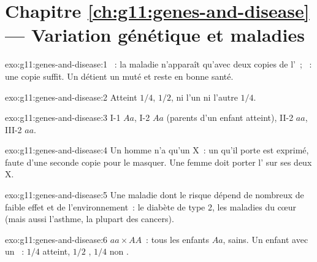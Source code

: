 \section*{Chapitre \ref{ch:g11:genes-and-disease} --- Variation génétique et maladies}

\begin{solution}{exo:g11:genes-and-disease:1}
~: la maladie n'apparaît qu'avec deux copies de l'~;
~: une copie suffit. Un  détient un  muté 
et reste en bonne santé.
\end{solution}

\begin{solution}{exo:g11:genes-and-disease:2}
Atteint $1/4$,  $1/2$, ni l'un ni l'autre $1/4$.
\end{solution}

\begin{solution}{exo:g11:genes-and-disease:3}
I-1 $Aa$, I-2 $Aa$ (parents d'un enfant atteint), II-2 $aa$, III-2
$aa$.
\end{solution}

\begin{solution}{exo:g11:genes-and-disease:4}
Un homme n'a qu'un  X~: un   qu'il porte est
exprimé, faute d'une seconde copie pour le masquer. Une femme doit
porter l' sur ses deux  X.
\end{solution}

\begin{solution}{exo:g11:genes-and-disease:5}
Une maladie dont le risque dépend de nombreux  de faible effet
et de l'environnement~: le diabète de type 2, les maladies du cœur
(mais aussi l'asthme, la plupart des cancers).
\end{solution}

\begin{solution}{exo:g11:genes-and-disease:6}
$aa \times AA$~: tous les enfants $Aa$,  sains. Un enfant
 avec un ~: $1/4$ atteint, $1/2$ , $1/4$ non
.
\end{solution}


